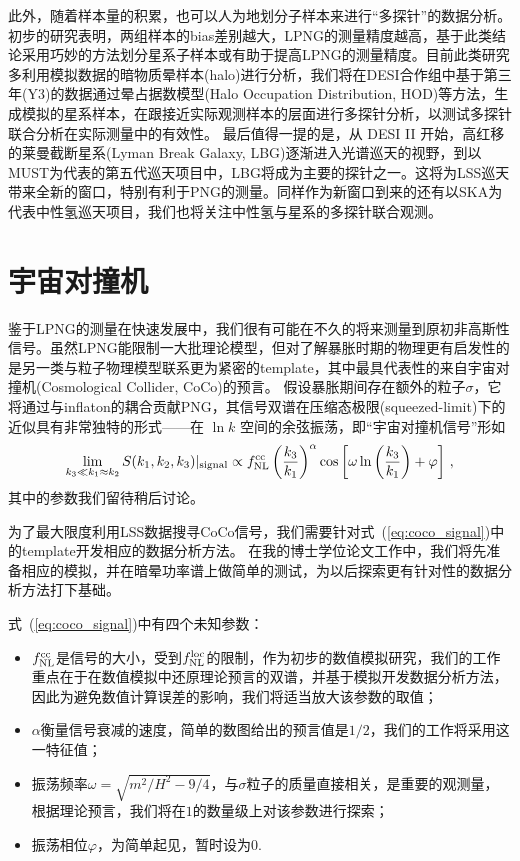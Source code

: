 此外，随着样本量的积累，也可以人为地划分子样本来进行“多探针”的数据分析。初步的研究表明，两组样本的bias差别越大，LPNG的测量精度越高\cite{barreira2023mtpng}，基于此类结论采用巧妙的方法划分星系子样本或有助于提高LPNG的测量精度。目前此类研究多利用模拟数据的暗物质晕样本(halo)进行分析，我们将在DESI合作组中基于第三年(Y3)的数据通过晕占据数模型(Halo Occupation Distribution, HOD)等方法，生成模拟的星系样本，在跟接近实际观测样本的层面进行多探针分析，以测试多探针联合分析在实际测量中的有效性。
最后值得一提的是，从 DESI II 开始，高红移的莱曼截断星系(Lyman Break Galaxy, LBG)逐渐进入光谱巡天的视野，到以MUST为代表的第五代巡天项目中，LBG将成为主要的探针之一。这将为LSS巡天带来全新的窗口，特别有利于PNG的测量。同样作为新窗口到来的还有以SKA为代表中性氢巡天项目，我们也将关注中性氢与星系的多探针联合观测。

\section{宇宙对撞机}

鉴于LPNG的测量在快速发展中，我们很有可能在不久的将来测量到原初非高斯性信号。虽然LPNG能限制一大批理论模型，但对了解暴胀时期的物理更有启发性的是另一类与粒子物理模型联系更为紧密的template，其中最具代表性的来自宇宙对撞机(Cosmological Collider, CoCo)的预言。
假设暴胀期间存在额外的粒子$\sigma$，它将通过与inflaton的耦合贡献PNG，其信号双谱在压缩态极限(squeezed-limit)下的近似具有非常独特的形式——在 $\ln k$ 空间的余弦振荡，即“宇宙对撞机信号”形如
\begin{equation}
    \lim_{k_3\ll k_1\approx k_2} S(k_1,k_2,k_3)|_{\rm signal} \propto f_{\rm NL}^{\rm cc} \left(\frac{k_3}{k_1}\right)^\alpha \cos\left[\omega \ln\left(\frac{k_3}{k_1}\right) + \varphi\right]\,, \label{eq:coco_signal}
\end{equation}
其中的参数我们留待稍后讨论。

为了最大限度利用LSS数据搜寻CoCo信号，我们需要针对式~(\ref{eq:coco_signal})中的template开发相应的数据分析方法。
在我的博士学位论文工作中，我们将先准备相应的模拟，并在暗晕功率谱上做简单的测试，为以后探索更有针对性的数据分析方法打下基础。

式~(\ref{eq:coco_signal})中有四个未知参数：
\begin{itemize}
    \item $f_{\rm NL}^{\rm cc}$是信号的大小，受到$f_{\rm NL}^{\rm loc}$的限制，作为初步的数值模拟研究，我们的工作重点在于在数值模拟中还原理论预言的双谱，并基于模拟开发数据分析方法，因此为避免数值计算误差的影响，我们将适当放大该参数的取值；
    \item $\alpha$衡量信号衰减的速度，简单的数图给出的预言值是$1/2$，我们的工作将采用这一特征值；
    \item 振荡频率$\omega=\sqrt{m^2/H^2-9/4}$，与$\sigma$粒子的质量直接相关，是重要的观测量，根据理论预言，我们将在$1$的数量级上对该参数进行探索；
    \item 振荡相位$\varphi$，为简单起见，暂时设为$0$.
\end{itemize}

